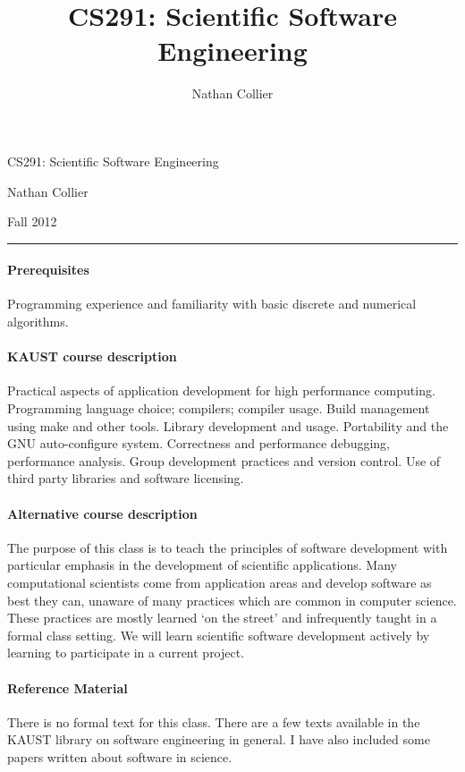 \documentclass[12 pt]{article}
\title{CS291: Scientific Software Engineering}
\author{Nathan Collier}
\begin{document}
{\large 
  \begin{flushleft}
    CS291: Scientific Software Engineering

    Nathan Collier
    
    Fall 2012
    
    \rule{\linewidth}{0.25mm}
\end{flushleft}}

\paragraph{Prerequisites} Programming experience and familiarity with basic discrete and numerical algorithms.

\paragraph{KAUST course description}

Practical aspects of application development for high performance
computing. Programming language choice; compilers; compiler
usage. Build management using make and other tools. Library
development and usage. Portability and the GNU auto-configure
system. Correctness and performance debugging, performance
analysis. Group development practices and version control. Use of
third party libraries and software licensing.

\paragraph{Alternative course description}

The purpose of this class is to teach the principles of software
development with particular emphasis in the development of scientific
applications. Many computational scientists come from application
areas and develop software as best they can, unaware of many practices
which are common in computer science. These practices are mostly
learned `on the street' and infrequently taught in a formal class
setting. We will learn scientific software development actively by
learning to participate in a current project.

\paragraph{Reference Material}

There is no formal text for this class. There are a few texts
available in the KAUST library on software engineering in general. I
have also included some papers written about software in science.
\end{document}
